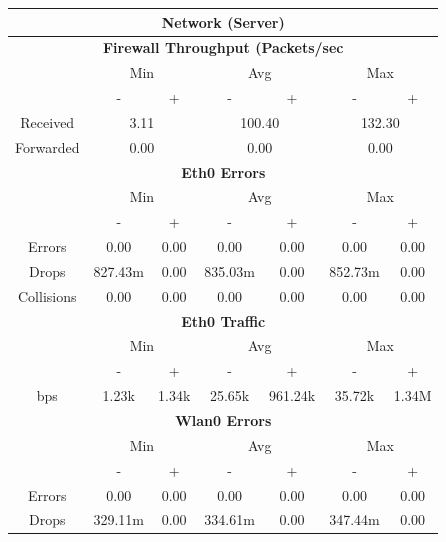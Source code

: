 \documentclass[11pt,a4paper,headinclude=false,footinclude=false]{scrreprt}
\begin{document}
\begin{table}[H]
\centering
    \begin{tabular}{||c|c|c|c|c|c|c||}
    \hline
    \multicolumn{7}{|c|}{\textbf{Network (Server)}} \\
    \hline
    \multicolumn{7}{|c|}{\textbf{Firewall Throughput (Packets/sec}} \\
    \hline\hline
      & \multicolumn{2}{|c|}{Min} & \multicolumn{2}{|c|}{Avg} & \multicolumn{2}{|c|}{Max} \\
    \hline
      & - & + & - & + & - & + \\
    \hline
    Received & \multicolumn{2}{|c|}{3.11} & \multicolumn{2}{|c|}{100.40} & \multicolumn{2}{|c|}{132.30} \\
    \hline
    Forwarded & \multicolumn{2}{|c|}{0.00} & \multicolumn{2}{|c|}{0.00} & \multicolumn{2}{|c|}{0.00} \\
    \hline\hline
    \multicolumn{7}{|c|}{\textbf{Eth0 Errors}} \\
    \hline\hline
      & \multicolumn{2}{|c|}{Min} & \multicolumn{2}{|c|}{Avg} & \multicolumn{2}{|c|}{Max} \\
    \hline
     & - & + & - & + & - & + \\
    \hline
    Errors & 0.00 & 0.00 & 0.00 & 0.00 & 0.00 & 0.00 \\
    \hline
    Drops & 827.43m & 0.00 & 835.03m & 0.00 & 852.73m & 0.00 \\
    \hline
    Collisions & 0.00 & 0.00 & 0.00 & 0.00 & 0.00 & 0.00 \\
    \hline\hline
    \multicolumn{7}{|c|}{\textbf{Eth0 Traffic}} \\
    \hline\hline
      & \multicolumn{2}{|c|}{Min} & \multicolumn{2}{|c|}{Avg} & \multicolumn{2}{|c|}{Max} \\
    \hline
      & - & + & - & + & - & + \\
    \hline
    bps & 1.23k & 1.34k & 25.65k & 961.24k & 35.72k & 1.34M \\
    \hline\hline
    \multicolumn{7}{|c|}{\textbf{Wlan0 Errors}} \\
    \hline\hline
      & \multicolumn{2}{|c|}{Min} & \multicolumn{2}{|c|}{Avg} & \multicolumn{2}{|c|}{Max} \\
    \hline
      & - & + & - & + & - & + \\
    \hline
    Errors  & 0.00 & 0.00 & 0.00 & 0.00 & 0.00 & 0.00 \\
    \hline
    Drops & 329.11m & 0.00 & 334.61m & 0.00 & 347.44m & 0.00 \\

\end{tabular}
\end{table}
\end{document}
